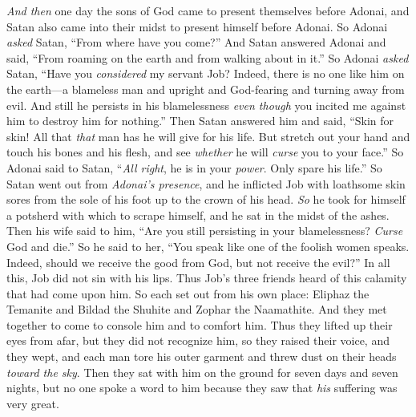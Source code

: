 \begin{biblechapter} %
 \textit{And then} one day the sons of God came to present themselves before Adonai, and Satan also came into their midst to present himself before Adonai.
\verse So Adonai \textit{asked} Satan, “From where have you come?” And Satan answered Adonai and said, “From roaming on the earth and from walking about in it.”
\verse So Adonai \textit{asked} Satan, “Have you \textit{considered} my servant Job? Indeed, there is no one like him on the earth—a blameless man and upright and God-fearing and turning away from evil. And still he persists in his blamelessness \textit{even though} you incited me against him to destroy him for nothing.”
\verse Then Satan answered him and said, “Skin for skin! All that \textit{that} man has he will give for his life.
\verse But stretch out your hand and touch his bones and his flesh, and see \textit{whether} he will \textit{curse} you to your face.”
\verse So Adonai said to Satan, “\textit{All right}, he is in your \textit{power}. Only spare his life.”
 So Satan went out from \textit{Adonai’s presence}, and he inflicted Job with loathsome skin sores from the sole of his foot up to the crown of his head.
\verse \textit{So} he took for himself a potsherd with which to scrape himself, and he sat in the midst of the ashes.
\verse Then his wife said to him, “Are you still persisting in your blamelessness? \textit{Curse} God and die.”
\verse So he said to her, “You speak like one of the foolish women speaks. Indeed, should we receive the good from God, but not receive the evil?” In all this, Job did not sin with his lips.
\verse Thus Job’s three friends heard of this calamity that had come upon him. So each set out from his own place: Eliphaz the Temanite and Bildad the Shuhite and Zophar the Naamathite. And they met together to come to console him and to comfort him.
\verse Thus they lifted up their eyes from afar, but they did not recognize him, so they raised their voice, and they wept, and each man tore his outer garment and threw dust on their heads \textit{toward the sky}.
\verse Then they sat with him on the ground for seven days and seven nights, but no one spoke a word to him because they saw that \textit{his} suffering was very great.
\end{biblechapter}

